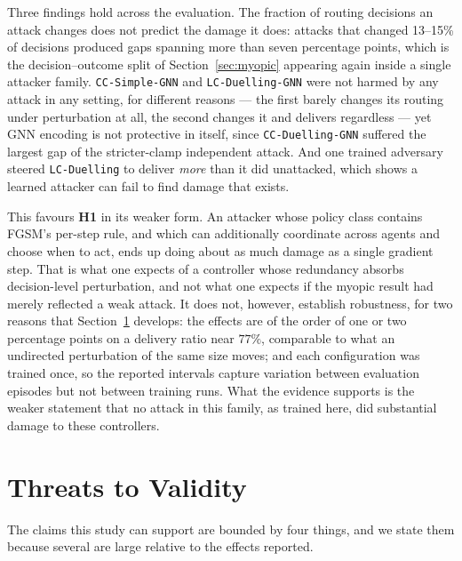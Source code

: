 \documentclass[10pt,journal,comsoc]{IEEEtran}
\begin{document}
Three findings hold across the evaluation. The fraction of routing decisions an attack
changes does not predict the damage it does: attacks that changed 13--15\% of decisions
produced gaps spanning more than seven percentage points, which is the decision--outcome
split of Section~\ref{sec:myopic} appearing again inside a single attacker family.
\texttt{CC-Simple-GNN} and \texttt{LC-Duelling-GNN} were not harmed by any attack in any
setting, for different reasons --- the first barely changes its routing under perturbation
at all, the second changes it and delivers regardless --- yet GNN encoding is not
protective in itself, since \texttt{CC-Duelling-GNN} suffered the largest gap of the
stricter-clamp independent attack. And one trained adversary steered \texttt{LC-Duelling}
to deliver \emph{more} than it did unattacked, which shows a learned attacker can fail to
find damage that exists.

This favours \textbf{H1} in its weaker form. An attacker whose policy class contains FGSM's
per-step rule, and which can additionally coordinate across agents and choose when to act,
ends up doing about as much damage as a single gradient step. That is what one expects of a
controller whose redundancy absorbs decision-level perturbation, and not what one expects if
the myopic result had merely reflected a weak attack. It does not, however, establish
robustness, for two reasons that Section~\ref{sec:threats-to-validity} develops: the effects
are of the order of one or two percentage points on a delivery ratio near $77\%$, comparable
to what an undirected perturbation of the same size moves; and each configuration was
trained once, so the reported intervals capture variation between evaluation episodes but
not between training runs. What the evidence supports is the weaker statement that no attack
in this family, as trained here, did substantial damage to these controllers.

\section{Threats to Validity}
\label{sec:threats-to-validity}
The claims this study can support are bounded by four things, and we state them because
several are large relative to the effects reported.
\end{document}
